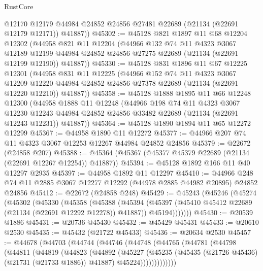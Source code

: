 \begin{lexlean}{RustCore}
\begin{coremodule}
        @12170
        @12179
        @44984
        @24852
        @24856
        @27481
        @22689
        (@21134 (@22691 @12179 @12171))
        @41887))
@45302 := @45128
    @821
    @1897
    @11
    @68
    @12204
    @12302
    (@44958
      @821
      @11
      @12204
      (@44966
        @132
        @74
        @11
        @4323
        @3067
        @12189
        @12199
        @44984
        @24852
        @24856
        @27275
        @22689
        (@21134 (@22691 @12199 @12190))
        @41887))
@45330 := @45128
    @831
    @1896
    @11
    @67
    @12225
    @12301
    (@44958
      @831
      @11
      @12225
      (@44966
        @152
        @74
        @11
        @4323
        @3067
        @12209
        @12220
        @44984
        @24852
        @24856
        @27378
        @22689
        (@21134 (@22691 @12220 @12210))
        @41887))
@45358 := @45128
    @1888
    @1895
    @11
    @66
    @12248
    @12300
    (@44958
      @1888
      @11
      @12248
      (@44966
        @198
        @74
        @11
        @4323
        @3067
        @12230
        @12243
        @44984
        @24852
        @24856
        @33482
        @22689
        (@21134 (@22691 @12243 @12231))
        @41887))
@45364 := @45128 @1890 @1894 @11 @65 @12272 @12299
@45367 := @44958 @1890 @11 @12272
@45377 := @44966 @207 @74 @11 @4323 @3067 @12253 @12267 @44984 @24852 @24856
@45379 := @22672 (@24858 @207)
@45388 := @45364 (@45367 (@45377 @45379 @22689 (@21134 (@22691 @12267 @12254)) @41887))
@45394 := @45128 @1892 @166 @11 @40 @12297 @2935
@45397 := @44958 @1892 @11 @12297
@45410 := @44966 @248 @74 @11 @2885 @3067 @12277 @12292 (@44978 @2885 @44982 @20895) @24852 @24856
@45412 := @22672 (@24858 @248)
@45429 := @45243
    (@45246
      (@45274
        (@45302
          (@45330
            (@45358
              (@45388
                (@45394
                  (@45397 (@45410 @45412 @22689 (@21134 (@22691 @12292 @12278)) @41887))
                  @45194)))))))
@45430 := @20539 @1886
@45431 := @20736 @45430
@45432 := @45429 @45431
@45433 := @20610 @2530
@45435 := @45432 (@21722 @45433)
@45436 := @20634 @2530
@45457 := @44678
    (@44703
      (@44744
        (@44746
          (@44748
            (@44765
              (@44781
                (@44798
                  (@44811
                    (@44819
                      (@44823
                        (@44892
                          (@45227
                            (@45235
                              (@45435 (@21726 @45436) (@21731 (@21733 @1886)) @41887)
                              @45224)))))))))))))

\end{coremodule}
\end{lexlean}
